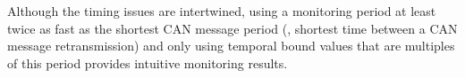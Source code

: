 Although the timing issues are intertwined, using a monitoring period at least twice as fast as the shortest CAN message period (\ie, shortest time between a CAN message retransmission) and only using temporal bound values that are multiples of this period provides intuitive monitoring results.


